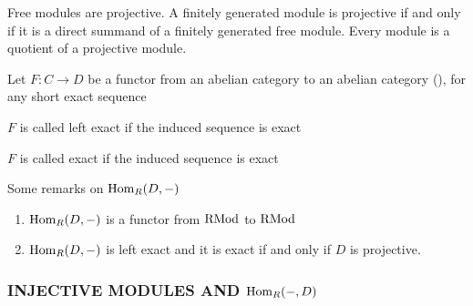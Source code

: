 \begin{corollary}
	Free modules are projective. A finitely generated module is projective if and only if it is a direct summand of a finitely generated free module. Every module is a quotient of a projective module.
\end{corollary}

\begin{remark}
	Let $F: C \to D$ be a functor from an abelian category to an abelian category (), for any short exact sequence
	\begin{center}
	\end{center}
	
	$F$ is called left exact if the induced sequence is exact
	\begin{center}
	\end{center}
	
	$F$ is called exact if the induced sequence is exact
	\begin{center}
	\end{center}
\end{remark}

\begin{remark}
	Some remarks on $\operatorname{Hom}_R(D, -)$
	\begin{enumerate}
		\item $\operatorname{Hom}_R(D, -)$ is a functor from $\operatorname{RMod}$ to $\operatorname{RMod}$
		\item $\operatorname{Hom}_R(D, -)$ is left exact and it is exact if and only if $D$ is projective.
	\end{enumerate}
\end{remark}

\subsubsection{INJECTIVE MODULES AND $\operatorname{Hom}_R(-, D)$} 

